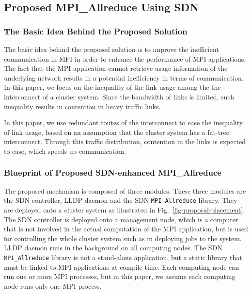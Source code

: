 \hypertarget{proposed-mpi_allreduce-using-sdn}{%
\subsection{Proposed MPI\_Allreduce Using
SDN}\label{proposed-mpi_allreduce-using-sdn}}

\hypertarget{the-basic-idea-behind-the-proposed-solution}{%
\subsubsection{The Basic Idea Behind the Proposed
Solution}\label{the-basic-idea-behind-the-proposed-solution}}

The basic idea behind the proposed solution is to improve the
inefficient communication in MPI in order to enhance the performance of
MPI applications. The fact that the MPI application cannot retrieve
usage information of the underlying network results in a potential
inefficiency in terms of communication. In this paper, we focus on the
inequality of the link usage among the the interconnect of a cluster
system. Since the bandwidth of links is limited, such inequality results
in contention in heavy traffic links.

In this paper, we use redundant routes of the interconnect to ease the
inequality of link usage, based on an assumption that the cluster system
has a fat-tree interconnect. Through this traffic distribution,
contention in the links is expected to ease, which speeds up
communication.

\hypertarget{blueprint-of-proposed-sdn-enhanced-mpi_allreduce}{%
\subsubsection{Blueprint of Proposed SDN-enhanced
MPI\_Allreduce}\label{blueprint-of-proposed-sdn-enhanced-mpi_allreduce}}

The proposed mechanism is composed of three modules. These three modules
are the SDN controller, LLDP daemon and the SDN \texttt{MPI\_Allreduce}
library. They are deployed onto a cluster system as illustrated in
Fig.~\ref{fig-proposal-placement}. The SDN controller is deployed onto a
management node, which is a computer that is not involved in the actual
computation of the MPI application, but is used for controlling the whole
cluster system such as in deploying jobs to the system. LLDP daemon runs in
the background on all computing nodes. The SDN \texttt{MPI\_Allreduce} library
is not a stand-alone application, but a static library that must be linked to
MPI applications at compile time. Each computing node can run one or more MPI
processes, but in this paper, we assume each computing node runs only one MPI
process.

